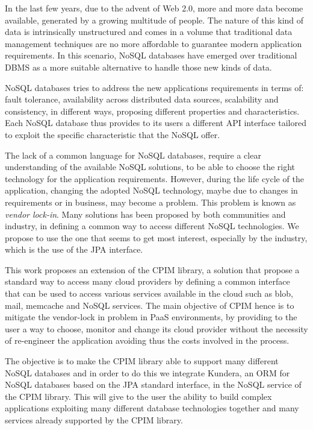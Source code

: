 In the last few years, due to the advent of Web 2.0, more and more data become available, generated by a growing multitude of people. The nature of this kind of data is intrinsically unstructured and comes in a volume that traditional data management techniques are no more affordable to guarantee modern application requirements.
In this scenario, NoSQL databases have emerged over traditional DBMS as a more suitable alternative to handle those new kinds of data.

\noindent NoSQL databases tries to address the new applications requirements in terms of: fault tolerance, availability across distributed data sources, scalability and consistency, in different ways, proposing different properties and characteristics. 
Each NoSQL database thus provides to its users a different API interface tailored to exploit the specific characteristic that the NoSQL offer.

\noindent The lack of a common language for NoSQL databases, require a clear understanding of the available NoSQL solutions, to be able to choose the right technology for the application requirements. However, during the life cycle of the application, changing the adopted NoSQL technology, maybe due to changes in requirements or in business, may become a problem. This problem is known as \textit{vendor lock-in}. Many solutions has been proposed by both communities and industry, in defining a common way to access different NoSQL technologies. We propose to use the one that seems to get most interest, especially by the industry, which is the use of the JPA interface.

\noindent This work proposes an extension of the CPIM library, a solution that propose a standard way to access many cloud providers by defining a common interface that can be used to access various services available in the cloud such as blob, mail, memcache and NoSQL services. The main objective of CPIM hence is to mitigate the vendor-lock in problem in PaaS environments, by providing to the user a way to choose, monitor and change its cloud provider without the necessity of re-engineer the application avoiding thus the costs involved in the process.

\noindent The objective is to make the CPIM library able to support many different NoSQL databases and in order to do this we integrate Kundera, an ORM for NoSQL databases based on the JPA standard interface, in the NoSQL service of the CPIM library. This will give to the user the ability to build complex applications exploiting many different database technologies together and many services already supported by the CPIM library.

